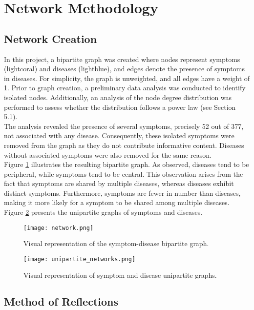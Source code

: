 \section{Network Methodology}
\subsection{Network Creation}
In this project, a bipartite graph was created where nodes represent symptoms (lightcoral) and diseases (lightblue),
and edges denote the presence of symptoms in diseases.
For simplicity, the graph is unweighted, and all edges have a weight of 1.
Prior to graph creation, a preliminary data analysis was conducted to identify isolated nodes.
Additionally, an analysis of the node degree distribution was performed to assess whether the distribution follows a power law (see Section 5.1).\\
The analysis revealed the presence of several symptoms, precisely 52 out of 377, not associated with any disease.
Consequently, these isolated symptoms were removed from the graph as they do not contribute informative content.
Diseases without associated symptoms were also removed for the same reason.\\
Figure \ref{fig:bipartite_graph} illustrates the resulting bipartite graph. As observed, diseases tend to be peripheral,
while symptoms tend to be central. This observation arises from the fact that symptoms are shared by multiple diseases,
whereas diseases exhibit distinct symptoms. Furthermore, symptoms are fewer in number than diseases,
making it more likely for a symptom to be shared among multiple diseases.\\
Figure \ref{fig:unipartite_graphs} presents the unipartite graphs of symptoms and diseases.
\begin{figure}[H]
    \centering
    \texttt{[image: network.png]}
    \caption{Visual representation of the symptom-disease bipartite graph.}
    \label{fig:bipartite_graph}
\end{figure}
\noindent

\begin{figure}[H]
    \centering
    \texttt{[image: unipartite\_networks.png]}
    \caption{Visual representation of symptom and disease unipartite graphs.}
    \label{fig:unipartite_graphs}
\end{figure}
\noindent

\subsection{Method of Reflections}


